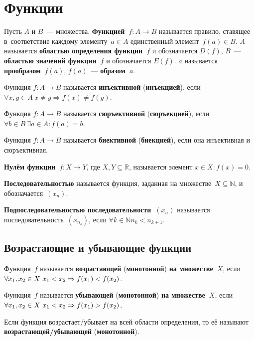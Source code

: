 \section{Функции}
 Пусть $A$ и $B$~--- множества.
\textbf{Функцией~$f \colon A \to B$} называется правило, ставящее в~соответствие каждому элементу~$a \in A$ единственный элемент~$f(a) \in B$.
$A$ называется \textbf{областью определения функции~$f$} и обозначается $D(f)$, $B$~--- \textbf{областью значений функции~$f$} и обозначается $E(f)$.
$a$ называется \textbf{прообразом~$f(a)$}, $f(a)$~--- \textbf{образом~$a$}.

 Функция $f \colon A \to B$ называется \textbf{инъективной} (\textbf{инъекцией}), если
$\forall x, y \in A	\ x \neq y \Rightarrow f(x) \neq f(y)$.

 Функция $f \colon A \to B$ называется \textbf{сюръективной} (\textbf{сюръекцией}), если
$\forall b \in B \ \exists a \in A \colon f(a) = b$.

 Функция $f \colon A \to B$ называется \textbf{биективной} (\textbf{биекцией}), если она инъективная и сюръективная.

\textbf{Нулём функции~$f \colon X \to Y$}, где $X, Y \subseteq \mathbb R$, называется элемент $x \in X \colon f(x) = 0$.

 \textbf{Последовательностью} называется функция, заданная на множестве~$X \subseteq \mathbb N$, и обозначается~$(x_n)$.

\textbf{Подпоследовательностью последовательности~$(x_n)$} называется последовательность~$(x_{n_k})$, если $\forall k \in \mathbb N \allowbreak n_k < n_{k+1}$.

\subsection{Возрастающие и убывающие функции}
 Функция~$f$ называется \textbf{возрастающей} (\textbf{монотонной}) \textbf{на множестве~$X$}, если $\forall x_1, x_2 \in X \ x_1 < x_2 \opbr\Rightarrow f(x_1) < \nobreak f(x_2)$.

 Функция~$f$ называется \textbf{убывающей} (\textbf{монотонной}) \textbf{на множестве~$X$}, если $\forall x_1, x_2 \in X \ x_1 < x_2 \opbr\Rightarrow f(x_1) > \nobreak f(x_2)$.

Если функция возрастает/убывает на всей области определения, то её называют \textbf{возрастающей/убывающей} (\textbf{монотонной}).

